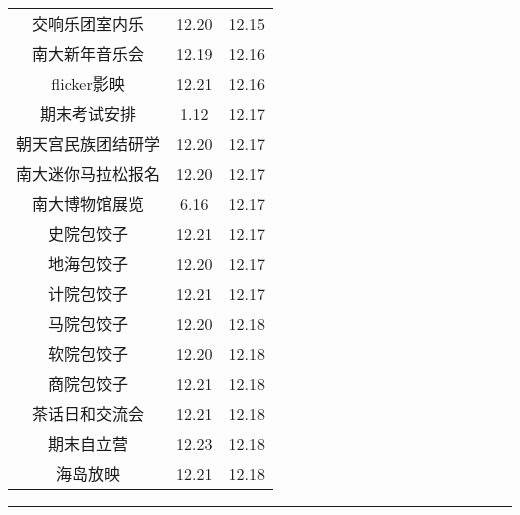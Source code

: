 \documentclass[letterpaper, 12pt]{article}
\begin{document}
\begin{multicols}{2}
{\begin{longtable}{|c|c|c|}
    交响乐团室内乐 & 12.20 & 12.15\\
    南大新年音乐会 & 12.19 & 12.16\\
    flicker影映 & 12.21 & 12.16\\
    期末考试安排 & 1.12 & 12.17\\
    朝天宫民族团结研学 & 12.20 & 12.17\\
    南大迷你马拉松报名 & 12.20 & 12.17\\
    南大博物馆展览 & 6.16 & 12.17\\
    史院包饺子 & 12.21 & 12.17\\
    地海包饺子 & 12.20 & 12.17\\
    计院包饺子 & 12.21 & 12.17\\
    马院包饺子 & 12.20 & 12.18\\
    软院包饺子 & 12.20 & 12.18\\
    商院包饺子 & 12.21 & 12.18\\
    茶话日和交流会 & 12.21 & 12.18\\
    期末自立营 & 12.23 & 12.18\\
    海岛放映 & 12.21 & 12.18\\
    \hline
\end{longtable}
\unskip
\unpenalty
\unpenalty}\unvbox\colbbox
\end{multicols}
\hrule
\pagebreak
\end{document}
